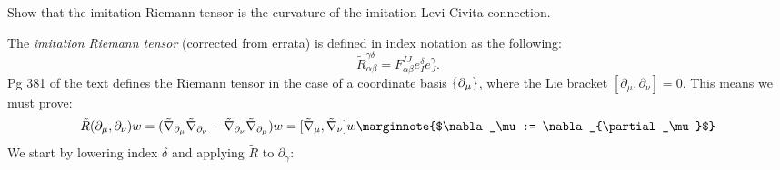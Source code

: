\documentclass[10pt]{article}
\begin{document}
\begin{example}\label{b3e35}
	Show that the imitation Riemann tensor is the curvature of the imitation Levi-Civita connection.
\end{example}
\sol The \emph{imitation Riemann tensor} (corrected from errata) is defined in index notation as the following:
$$
	\tilde{R}_{\alpha\beta}^{\gamma\delta} = F_{\alpha\beta}^{IJ} e_I^\delta e_J^\gamma.
$$
Pg 381 of the text defines the Riemann tensor in the case of a coordinate basis $\lbrace\partial_\mu\rbrace$, where the Lie bracket $[\partial_\mu,\partial_\nu]=0$. This means we must prove:
$$
	\tilde{R}(\partial_\mu,\partial_\nu)w = (\tilde{\nabla}_{\partial_\mu}\tilde{\nabla}_{\partial_\nu} - \tilde{\nabla}_{\partial_\nu}\tilde{\nabla}_{\partial_\mu})w = [\tilde{\nabla}_{\mu},\tilde{\nabla}_{\nu}]w\marginnote{$\nabla_\mu := \nabla_{\partial_\mu}$}
$$
We start by lowering index $\delta$ and applying $\tilde{R}$ to $\partial_\gamma$:
\end{document}
